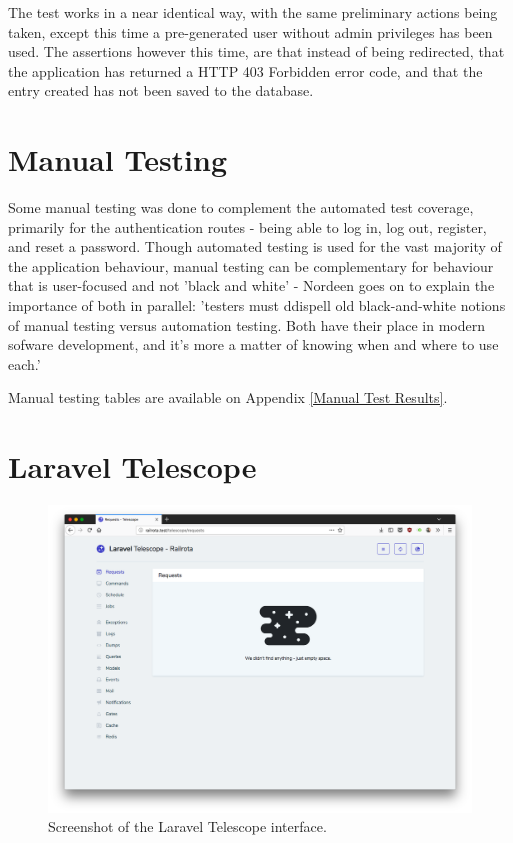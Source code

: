 The test works in a near identical way, with the same preliminary actions being taken, except this time a pre-generated user without admin privileges has been used. The assertions however this time, are that instead of being redirected, that the application has returned a HTTP 403 Forbidden error code, and that the entry created has not been saved to the database.

\section{Manual Testing}
Some manual testing was done to complement the automated test coverage, primarily for the authentication routes - being able to log in, log out, register, and reset a password. Though automated testing is used for the vast majority of the application behaviour, manual testing can be complementary for behaviour that is user-focused and not 'black and white' - Nordeen goes on to explain the importance of both in parallel: 'testers must ddispell old black-and-white notions of manual testing versus automation testing. Both have their place in modern sofware development, and it's more a matter of knowing when and where to use each.' \cite{Nordeen1}

Manual testing tables are available on Appendix \ref{Manual Test Results}.

\section{Laravel Telescope}

\begin{figure}[!ht]
    \centering
    \includegraphics[width=1.0\textwidth]{Figures/screenshot-telescope}
    \caption{Screenshot of the Laravel Telescope interface.}
    \label{fig:telescope}
\end{figure}

